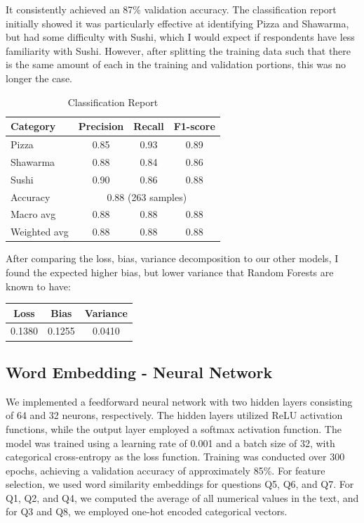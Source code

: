 It consistently achieved an 87\% validation accuracy. The classification report initially showed it was particularly effective at identifying Pizza and Shawarma, but had some difficulty with Sushi, which I would expect if respondents have less familiarity with Sushi. However, after splitting the training data such that there is the same amount of each in the training and validation portions, this was no longer the case.
\begin{table}[ht]
    \centering
    \begin{tabular}{lccc}
        \hline
        Category     & Precision                              & Recall & F1-score \\
        \hline
        Pizza        & 0.85                                   & 0.93   & 0.89     \\
        Shawarma     & 0.88                                   & 0.84   & 0.86     \\
        Sushi        & 0.90                                   & 0.86   & 0.88     \\
        \hline
        Accuracy     & \multicolumn{3}{c}{0.88 (263 samples)}                     \\
        Macro avg    & 0.88                                   & 0.88   & 0.88     \\
        Weighted avg & 0.88                                   & 0.88   & 0.88     \\
        \hline
    \end{tabular}
    \caption{Classification Report}
    \label{tab:classification_report}
\end{table}

After comparing the loss, bias, variance decomposition to our other models, I found the expected higher bias, but lower variance that Random Forests are known to have:
\begin{table}[ht]
    \centering
    \begin{tabular}{ccc}
        \hline
        Loss   & Bias   & Variance \\
        \hline
        0.1380 & 0.1255 & 0.0410   \\
        \hline
    \end{tabular}
    \label{tab:loss_report}
\end{table}

\subsection{Word Embedding - Neural Network}
We implemented a feedforward neural network with two hidden layers consisting of 64 and 32 neurons, respectively. The hidden layers utilized ReLU activation functions, while the output layer employed a softmax activation function. The model was trained using a learning rate of 0.001 and a batch size of 32, with categorical cross-entropy as the loss function. Training was conducted over 300 epochs, achieving a validation accuracy of approximately 85\%. For feature selection, we used word similarity embeddings for questions Q5, Q6, and Q7. For Q1, Q2, and Q4, we computed the average of all numerical values in the text, and for Q3 and Q8, we employed one-hot encoded categorical vectors.

